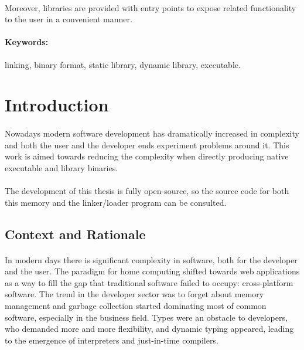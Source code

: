 \documentclass[12pt]{article}
\begin{document}
	\paragraph{}Moreover, libraries are provided with entry points to expose related functionality to the user in a convenient manner.
	\paragraph{Keywords:} linking, binary format, static library, dynamic library, executable.
	\newpage
	
	\tableofcontents
	\newpage
	
	\listoffigures
	\newpage
	
	\section{Introduction}
	\paragraph{}Nowadays modern software development has dramatically increased in complexity and both the user and the developer ends experiment problems around it. This work is aimed towards reducing the complexity when directly producing native executable and library binaries.
	\paragraph{}The development of this thesis is fully open-source, so the source code for both this memory and the linker/loader program can be consulted\cite{self}.
	\subsection{Context and Rationale}
	\paragraph{}In modern days there is significant complexity in software, both for the developer and the user. The paradigm for home computing shifted towards web applications as a way to fill the gap that traditional software failed to occupy: cross-platform software. The trend in the developer sector was to forget about memory management and garbage collection started dominating most of common software, especially in the business field. Types were an obstacle to developers, who demanded more and more flexibility, and dynamic typing appeared, leading to the emergence of interpreters and just-in-time compilers.
\end{document}
